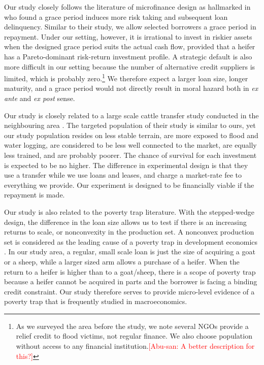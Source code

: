 	Our study closely follows the literature of microfinance design as hallmarked in \citet{Field2013} who found a grace period induces more risk taking and subsequent loan delinquency. Similar to their study, we allow selected borrowers a grace period in repayment. Under our setting, however, it is irrational to invest in riskier assets when the designed grace period suits the actual cash flow, provided that a heifer has a Pareto-dominant risk-return investment profile. A strategic default is also more difficult in our setting because the number of alternative credit suppliers is limited, which is probably zero.\footnote{As we surveyed the area before the study, we note several NGOs provide a relief credit to flood victims, not regular finance. We also choose population without access to any financial institution.\textcolor{red}{[Abu-san: A better description for this?]} } We therefore expect a larger loan size, longer maturity, and a grace period would not directly result in moral hazard both in \textit{ex ante} and \textit{ex post} sense. 

	Our study is closely related to a large scale cattle transfer study conducted in the neighbouring area \citep{BandieraBRAC2017, Balboni2020}. The targeted population of their study is similar to ours, yet our study population resides on less stable terrain, are more exposed to flood and water logging, are considered to be less well connected to the market, are equally less trained, and are probably poorer. The chance of survival for each investment is expected to be no higher. The difference in experimental design is that they use a transfer while we use loans and leases, and charge a market-rate fee to everything we provide. Our experiment is designed to be financially viable if the repayment is made. 

	Our study is also related to the poverty trap literature. With the stepped-wedge design, the difference in the loan size allows us to test if there is an increasing returns to scale, or nonconvexity in the production set. A nonconvex production set is considered as the leading cause of a poverty trap in development economics \citep{GalorZeira1993}. In our study area, a regular, small scale loan is just the size of acquiring a goat or a sheep, while a larger sized arm allows a purchase of a heifer. When the return to a heifer is higher than to a goat/sheep, there is a scope of poverty trap because a heifer cannot be acquired in parts and the borrower is facing a binding credit constraint. Our study therefore serves to provide micro-level evidence of a poverty trap that is frequently studied in macroeconomics.
	
